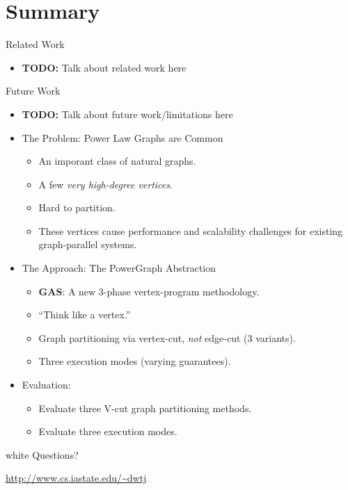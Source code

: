 \section*{Summary}

\begin{frame}{Related Work}
  \begin{itemize}
    \item \textbf{TODO:} Talk about related work here
  \end{itemize}
\end{frame}


\begin{frame}{Future Work}
  \begin{itemize}
    \item \textbf{TODO:} Talk about future work/limitations here
  \end{itemize}
\end{frame}


\begin{frame}
\begin{itemize}
  \frametitle{Overview}
  \item The Problem: Power Law Graphs are Common
  \begin{itemize}
    \item An imporant class of natural graphs.
    \item A few \textit{very high-degree vertices}.
    \item Hard to partition.
    \item These vertices cause performance and scalability challenges for
          existing graph-parallel systems.
  \end{itemize}
\end{itemize}
\end{frame}

\begin{frame}
\begin{itemize}
  \frametitle{Overview}
  \item The Approach: The PowerGraph Abstraction
  \begin{itemize}
    \item \textbf{GAS}: A new 3-phase vertex-program methodology.
    \item ``Think like a vertex.'' \citep[SIGMOD '10]{malewicz2010pregel}
    \item Graph partitioning via vertex-cut, \textit{not} edge-cut (3 variants).
    \item Three execution modes (varying guarantees).
  \end{itemize}

  \item Evaluation:
  \begin{itemize}
    \item Evaluate three V-cut graph partitioning methods.
    \item Evaluate three execution modes.
  \end{itemize}
\end{itemize}
\end{frame}

\begin{frame}
\begin{beamercolorbox}[center]{white}
  {\Large Questions?}

  \vspace{2em}\hfill

  \url{http://www.cs.iastate.edu/~dwtj}
\end{beamercolorbox}
\end{frame}
